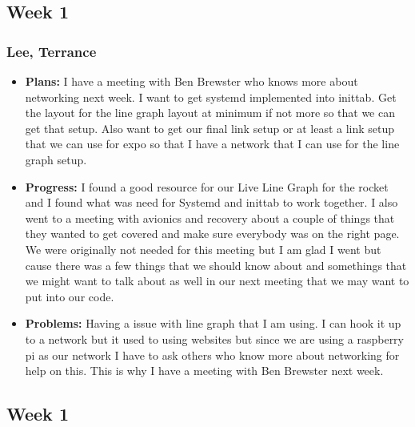 \documentclass[10pt,draftclsnofoot,onecolumn]{IEEEtran}
\begin{document}
\subsection{Week 1}
\subsubsection{Lee, Terrance}
\begin{itemize}
	\item \textbf{Plans: }
	I have a meeting with Ben Brewster who knows more about networking next week. I want to get systemd implemented into inittab. Get the layout for the line graph layout at minimum if not more so that we can get that setup. Also want to get our final link setup or at least a link setup that we can use for expo so that I have a network that I can use for the line graph setup.
	\item \textbf{Progress: }
	I found a good resource for our Live Line Graph for the rocket and I found what was need for Systemd and inittab to work together. I also went to a meeting with avionics and recovery about a couple of things that they wanted to get covered and make sure everybody was on the right page. We were originally not needed for this meeting but I am glad I went but cause there was a few things that we should know about and somethings that we might want to talk about as well in our next meeting that we may want to put into our code.
	\item \textbf{Problems: }
	Having a issue with line graph that I am using. I can hook it up to a network but it used to using websites but since we are using a raspberry pi as our network I have to ask others who know more about networking for help on this. This is why I have a meeting with Ben Brewster next week.
\end{itemize}


\subsection{Week 1}
\end{document}
